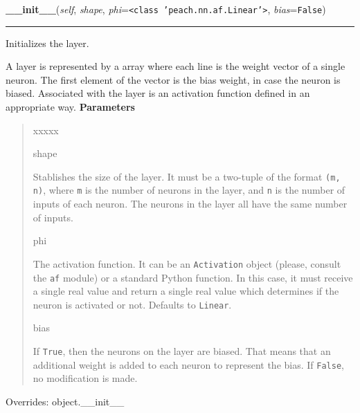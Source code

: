 \hspace{.8\funcindent}\begin{boxedminipage}{\funcwidth}

    \raggedright \textbf{\_\_init\_\_}(\textit{self}, \textit{shape}, \textit{phi}={\tt {\textless}class 'peach.nn.af.Linear'{\textgreater}}, \textit{bias}={\tt False})

    \vspace{-1.5ex}

    \rule{\textwidth}{0.5\fboxrule}
\setlength{\parskip}{2ex}

Initializes the layer.

A layer is represented by a array where each line is the weight vector
of a single neuron. The first element of the vector is the bias weight,
in case the neuron is biased. Associated with the layer is an activation
function defined in an appropriate way.
\setlength{\parskip}{1ex}
      \textbf{Parameters}
      \vspace{-1ex}

      \begin{quote}
        \begin{Ventry}{xxxxx}

          \item[shape]


Stablishes the size of the layer. It must be a two-tuple of the
format \texttt{(m, n)}, where \texttt{m} is the number of neurons in the
layer, and \texttt{n} is the number of inputs of each neuron. The neurons
in the layer all have the same number of inputs.
          \item[phi]


The activation function. It can be an \texttt{Activation} object (please,
consult the \texttt{af} module) or a standard Python function. In this
case, it must receive a single real value and return a single real
value which determines if the neuron is activated or not. Defaults
to \texttt{Linear}.
          \item[bias]


If \texttt{True}, then the neurons on the layer are biased. That means
that an additional weight is added to each neuron to represent the
bias. If \texttt{False}, no modification is made.
        \end{Ventry}

      \end{quote}

      Overrides: object.\_\_init\_\_

    \end{boxedminipage}

